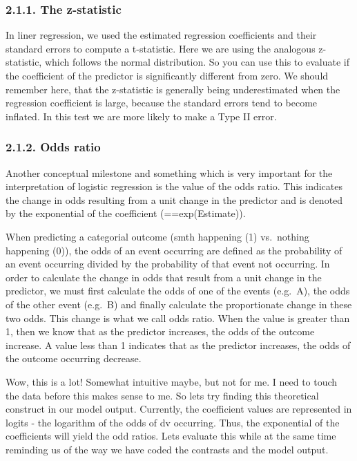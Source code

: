 \documentclass[
]{article}
\begin{document}
\hypertarget{the-z-statistic}{%
\subsubsection{2.1.1. The z-statistic}\label{the-z-statistic}}

In liner regression, we used the estimated regression coefficients and
their standard errors to compute a t-statistic. Here we are using the
analogous z-statistic, which follows the normal distribution. So you can
use this to evaluate if the coefficient of the predictor is
significantly different from zero. We should remember here, that the
z-statistic is generally being underestimated when the regression
coefficient is large, because the standard errors tend to become
inflated. In this test we are more likely to make a Type II error.

\hypertarget{odds-ratio}{%
\subsubsection{2.1.2. Odds ratio}\label{odds-ratio}}

Another conceptual milestone and something which is very important for
the interpretation of logistic regression is the value of the odds
ratio. This indicates the change in odds resulting from a unit change in
the predictor and is denoted by the exponential of the coefficient
(==exp(Estimate)).

When predicting a categorial outcome (smth happening (1) vs.~nothing
happening (0)), the odds of an event occurring are defined as the
probability of an event occurring divided by the probability of that
event not occurring. In order to calculate the change in odds that
result from a unit change in the predictor, we must first calculate the
odds of one of the events (e.g.~A), the odds of the other event (e.g.~B)
and finally calculate the proportionate change in these two odds. This
change is what we call odds ratio. When the value is greater than 1,
then we know that as the predictor increases, the odds of the outcome
increase. A value less than 1 indicates that as the predictor increases,
the odds of the outcome occurring decrease.

Wow, this is a lot! Somewhat intuitive maybe, but not for me. I need to
touch the data before this makes sense to me. So lets try finding this
theoretical construct in our model output. Currently, the coefficient
values are represented in logits - the logarithm of the odds of dv
occurring. Thus, the exponential of the coefficients will yield the odd
ratios. Lets evaluate this while at the same time reminding us of the
way we have coded the contrasts and the model output.
\end{document}
